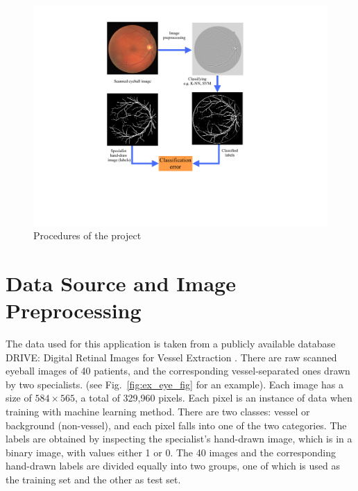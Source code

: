 \documentclass[12pt, notitlepage]{article}
\newcommand{\fref}[1]{Fig.~\ref{#1}}
\begin{document}
\begin{figure}[h]
\centering
\includegraphics[width=0.8\columnwidth]{figures/procedure_project}
\caption{Procedures of the project}
\label{fig:procedure_project}
\end{figure}
  
\section{Data Source and Image Preprocessing}  

The data used for this application is taken from a publicly available database DRIVE: Digital Retinal Images for Vessel Extraction \cite{staal2004ridge}.  There are raw scanned eyeball images of 40 patients, and the corresponding vessel-separated ones drawn by two specialists. (see \fref{fig:ex_eye_fig} for an example). Each image has a size of $584\times565$, a total of 329,960 pixels. Each pixel is an instance of data when training with machine learning method. There are two classes: vessel or background (non-vessel), and each pixel falls into one of the two categories.  The labels are obtained by inspecting the specialist's hand-drawn image, which is in a binary image, with values either 1 or 0.  The 40 images and the corresponding hand-drawn labels are divided equally into two groups, one of which is used as the training set and the other as test set.
\end{document}
